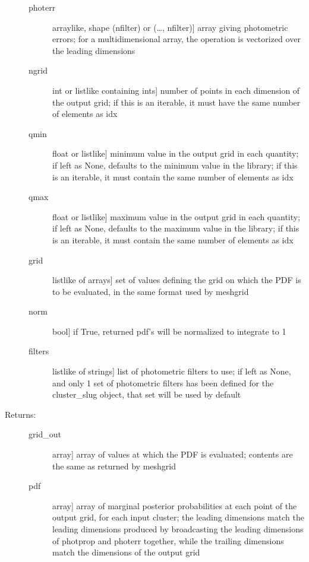 \documentclass[letterpaper,10pt,english]{sphinxmanual}
\begin{document}
\begin{fulllineitems}
\begin{fulllineitems}
\begin{description}
\begin{description}
\item[{photerr}] \leavevmode{[}arraylike, shape (nfilter) or (…, nfilter){]}
array giving photometric errors; for a multidimensional
array, the operation is vectorized over the leading
dimensions

\item[{ngrid}] \leavevmode{[}int or listlike containing ints{]}
number of points in each dimension of the output grid;
if this is an iterable, it must have the same number of
elements as idx

\item[{qmin}] \leavevmode{[}float or listlike{]}
minimum value in the output grid in each quantity; if
left as None, defaults to the minimum value in the
library; if this is an iterable, it must contain the
same number of elements as idx

\item[{qmax}] \leavevmode{[}float or listlike{]}
maximum value in the output grid in each quantity; if
left as None, defaults to the maximum value in the
library; if this is an iterable, it must contain the
same number of elements as idx

\item[{grid}] \leavevmode{[}listlike of arrays{]}
set of values defining the grid on which the PDF is to
be evaluated, in the same format used by meshgrid

\item[{norm}] \leavevmode{[}bool{]}
if True, returned pdf’s will be normalized to integrate
to 1

\item[{filters}] \leavevmode{[}listlike of strings{]}
list of photometric filters to use; if left as None, and
only 1 set of photometric filters has been defined for
the cluster\_slug object, that set will be used by
default

\end{description}

\item[{Returns:}] \leavevmode\begin{description}
\item[{grid\_out}] \leavevmode{[}array{]}
array of values at which the PDF is evaluated; contents
are the same as returned by meshgrid

\item[{pdf}] \leavevmode{[}array{]}
array of marginal posterior probabilities at each point
of the output grid, for each input cluster; the leading
dimensions match the leading dimensions produced by
broadcasting the leading dimensions of photprop and
photerr together, while the trailing dimensions match
the dimensions of the output grid


\end{description}
\end{description}
\end{fulllineitems}
\end{fulllineitems}
\end{document}

